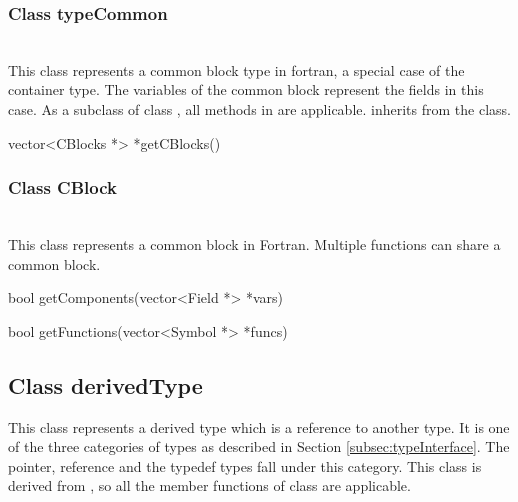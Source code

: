 \subsubsection{Class typeCommon}
\mbox{ }\\

This class represents a common block type in fortran, a special case of the container type. The variables of the common block represent the fields in this case. As a subclass of class , all methods in  are applicable.  inherits from the  class.


\begin{apient}
vector<CBlocks *> *getCBlocks()
\end{apient}

\subsubsection{Class CBlock}
\mbox{ }\\

This class represents a common block in Fortran. Multiple functions can share a common block.

\begin{apient}
bool getComponents(vector<Field *> *vars)
\end{apient}

\begin{apient}
bool getFunctions(vector<Symbol *> *funcs)
\end{apient}

\subsection{Class derivedType}
This class represents a derived type which is a reference to another type. It is one of the three categories of types as described in Section \ref{subsec:typeInterface}. The pointer, reference and the typedef types fall under this category. This class is derived from , so all the member functions of class  are applicable.


